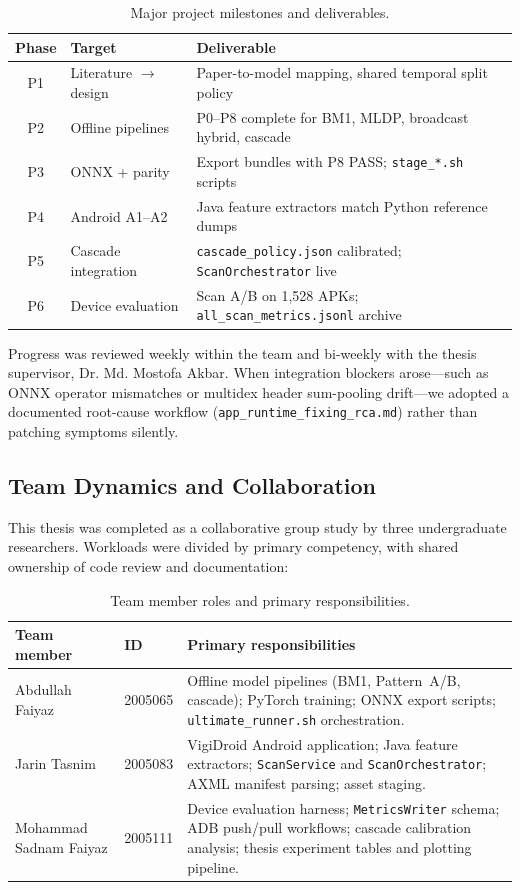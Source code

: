 \begin{table}[H]
\centering
\small
\begin{tabular}{@{}clp{7.8cm}@{}}
\toprule
\textbf{Phase} & \textbf{Target} & \textbf{Deliverable} \\
\midrule
P1 & Literature $\rightarrow$ design & Paper-to-model mapping, shared temporal split policy \\
P2 & Offline pipelines & P0--P8 complete for BM1, MLDP, broadcast hybrid, cascade \\
P3 & ONNX + parity & Export bundles with P8 PASS; \texttt{stage\_*.sh} scripts \\
P4 & Android A1--A2 & Java feature extractors match Python reference dumps \\
P5 & Cascade integration & \texttt{cascade\_policy.json} calibrated; \texttt{ScanOrchestrator} live \\
P6 & Device evaluation & Scan A/B on 1,528 APKs; \texttt{all\_scan\_metrics.jsonl} archive \\
\bottomrule
\end{tabular}
\caption{Major project milestones and deliverables.}
\label{tab:milestones}
\end{table}

Progress was reviewed weekly within the team and bi-weekly with the thesis supervisor, Dr. Md. Mostofa Akbar. When integration blockers arose---such as ONNX operator mismatches or multidex header sum-pooling drift---we adopted a documented root-cause workflow (\texttt{app\_runtime\_fixing\_rca.md}) rather than patching symptoms silently.

\subsection{Team Dynamics and Collaboration}
This thesis was completed as a collaborative group study by three undergraduate researchers. Workloads were divided by primary competency, with shared ownership of code review and documentation:

\begin{table}[H]
\centering
\small
\begin{tabular}{@{}p{3.6cm}p{2.2cm}p{7.2cm}@{}}
\toprule
\textbf{Team member} & \textbf{ID} & \textbf{Primary responsibilities} \\
\midrule
Abdullah Faiyaz & 2005065 &
Offline model pipelines (BM1, Pattern~A/B, cascade); PyTorch training; ONNX export scripts; \texttt{ultimate\_runner.sh} orchestration. \\
Jarin Tasnim & 2005083 &
VigiDroid Android application; Java feature extractors; \texttt{ScanService} and \texttt{ScanOrchestrator}; AXML manifest parsing; asset staging. \\
Mohammad Sadnam Faiyaz & 2005111 &
Device evaluation harness; \texttt{MetricsWriter} schema; ADB push/pull workflows; cascade calibration analysis; thesis experiment tables and plotting pipeline. \\
\bottomrule
\end{tabular}
\caption{Team member roles and primary responsibilities.}
\label{tab:team-roles}
\end{table}

